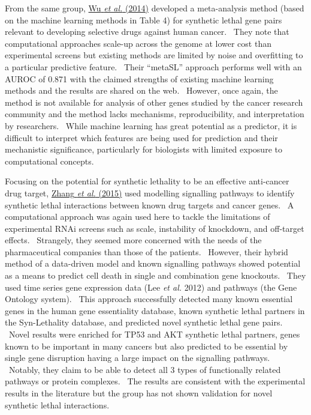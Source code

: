 From the same group, \hyperlink{ENREF114}{Wu}\hyperlink{ENREF114}{\textit{ et al.}}\hyperlink{ENREF114}{ (2014)} developed a meta-analysis method (based on the machine learning methods in Table 4) for synthetic lethal gene pairs relevant to developing selective drugs against human cancer. \ They note that computational approaches scale-up across the genome at lower cost than experimental screens but existing methods are limited by noise and overfitting to a particular predictive feature. \ Their {\textquotedblleft}metaSL{\textquotedblright} approach performs well with an AUROC of 0.871 with the claimed strengths of existing machine learning methods and the results are shared on the web. \ However, once again, the method is not available for analysis of other genes studied by the cancer research community and the method lacks mechanisms, reproducibility, and interpretation by researchers. \ While machine learning has great potential as a predictor, it is difficult to interpret which features are being used for prediction and their mechanistic significance, particularly for biologists with limited exposure to computational concepts. \  

Focusing on the potential for synthetic lethality to be an effective anti-cancer drug target, \hyperlink{ENREF117}{Zhang}\hyperlink{ENREF117}{\textit{ et al.}}\hyperlink{ENREF117}{ (2015)} used modelling signalling pathways to identify synthetic lethal interactions between known drug targets and cancer genes. \ A computational approach was again used here to tackle the limitations of experimental RNAi screens such as scale, instability of knockdown, and off-target effects. \ Strangely, they seemed more concerned with the needs of the pharmaceutical companies than those of the patients. \ However, their {\textquotesingle}hybrid{\textquotesingle} method of a data-driven model and known signalling pathways showed potential as a means to predict cell death in single and combination gene knockouts. \ They used time series gene expression data (Lee\textit{ et al.} 2012) and pathways (the Gene Ontology system). \ This approach successfully detected many known essential genes in the human gene essentiality database, known synthetic lethal partners in the Syn-Lethality database, and predicted novel synthetic lethal gene pairs. \ Novel results were enriched for TP53 and AKT synthetic lethal partners, genes known to be important in many cancers but also predicted to be essential by single gene disruption having a large impact on the signalling pathways. \ Notably, they claim to be able to detect all 3 types of functionally related pathways or protein complexes. \ The results are consistent with the experimental results in the literature but the group has not shown validation for novel synthetic lethal interactions. \  

